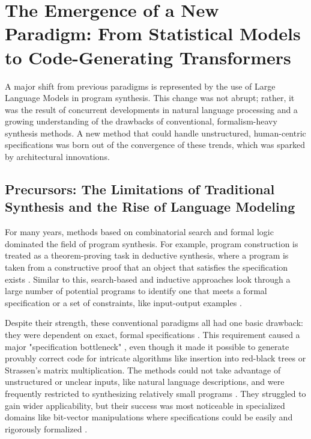 \documentclass[12pt, a4paper]{report}
\begin{document}
\section{The Emergence of a New Paradigm: From Statistical Models to Code-Generating Transformers}

A major shift from previous paradigms is represented by the use of Large Language Models in program synthesis. This change was not abrupt; rather, it was the result of concurrent developments in natural language processing and a growing understanding of the drawbacks of conventional, formalism-heavy synthesis methods. A new method that could handle unstructured, human-centric specifications was born out of the convergence of these trends, which was sparked by architectural innovations.

\subsection{Precursors: The Limitations of Traditional Synthesis and the Rise of Language Modeling}

For many years, methods based on combinatorial search and formal logic dominated the field of program synthesis. For example, program construction is treated as a theorem-proving task in deductive synthesis, where a program is taken from a constructive proof that an object that satisfies the specification exists \citep{manna1980theory}. Similar to this, search-based and inductive approaches look through a large number of potential programs to identify one that meets a formal specification or a set of constraints, like input-output examples \citep{alur2013syntax, gulwani2017program}.

Despite their strength, these conventional paradigms all had one basic drawback: they were dependent on exact, formal specifications \citep{gulwani2017program}. This requirement caused a major "specification bottleneck" \citep{gulwani2017program}, even though it made it possible to generate provably correct code for intricate algorithms like insertion into red-black trees or Strassen's matrix multiplication. The methods could not take advantage of unstructured or unclear inputs, like natural language descriptions, and were frequently restricted to synthesizing relatively small programs \citep{gulwani2017program}. They struggled to gain wider applicability, but their success was most noticeable in specialized domains like bit-vector manipulations where specifications could be easily and rigorously formalized \citep{solar2008combinatorial}.
\end{document}
